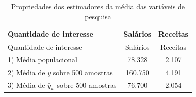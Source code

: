 \documentclass[]{book}
\theoremstyle{definition}
\theoremstyle{definition}
\theoremstyle{definition}
\theoremstyle{remark}
\begin{document}
\begin{longtable}[]{@{}lcc@{}}
\caption{\label{tab:proestmed} Propriedades dos estimadores da média das
variáveis de pesquisa}\tabularnewline
\toprule
\begin{minipage}[b]{0.43\columnwidth}\raggedright\strut
Quantidade de interesse\strut
\end{minipage} & \begin{minipage}[b]{0.14\columnwidth}\centering\strut
Salários\strut
\end{minipage} & \begin{minipage}[b]{0.14\columnwidth}\centering\strut
Receitas\strut
\end{minipage}\tabularnewline
\midrule
\endfirsthead
\toprule
\begin{minipage}[b]{0.43\columnwidth}\raggedright\strut
Quantidade de interesse\strut
\end{minipage} & \begin{minipage}[b]{0.14\columnwidth}\centering\strut
Salários\strut
\end{minipage} & \begin{minipage}[b]{0.14\columnwidth}\centering\strut
Receitas\strut
\end{minipage}\tabularnewline
\midrule
\endhead
\begin{minipage}[t]{0.43\columnwidth}\raggedright\strut
1) Média populacional\strut
\end{minipage} & \begin{minipage}[t]{0.14\columnwidth}\centering\strut
78.328\strut
\end{minipage} & \begin{minipage}[t]{0.14\columnwidth}\centering\strut
2.107\strut
\end{minipage}\tabularnewline
\begin{minipage}[t]{0.43\columnwidth}\raggedright\strut
2) Média de \(\bar{y}\) sobre 500 amostras\strut
\end{minipage} & \begin{minipage}[t]{0.14\columnwidth}\centering\strut
160.750\strut
\end{minipage} & \begin{minipage}[t]{0.14\columnwidth}\centering\strut
4.191\strut
\end{minipage}\tabularnewline
\begin{minipage}[t]{0.43\columnwidth}\raggedright\strut
3) Média de \(\bar{y}_{w}\) sobre 500 amostras\strut
\end{minipage} & \begin{minipage}[t]{0.14\columnwidth}\centering\strut
76.700\strut
\end{minipage} & \begin{minipage}[t]{0.14\columnwidth}\centering\strut
2.054\strut
\end{minipage}\tabularnewline
\bottomrule
\end{longtable}
\end{document}
